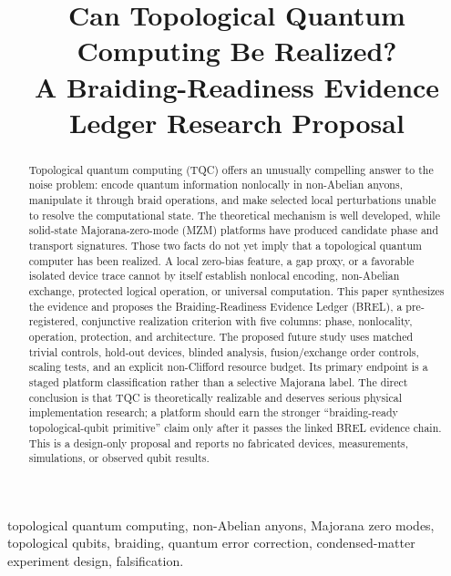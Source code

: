 \documentclass[conference]{IEEEtran}
\begin{document}
\title{Can Topological Quantum Computing Be Realized?\\
\large A Braiding-Readiness Evidence Ledger Research Proposal}

\author{
}

\maketitle

\begin{abstract}
Topological quantum computing (TQC) offers an unusually compelling answer to the noise problem: encode quantum information nonlocally in non-Abelian anyons, manipulate it through braid operations, and make selected local perturbations unable to resolve the computational state. The theoretical mechanism is well developed, while solid-state Majorana-zero-mode (MZM) platforms have produced candidate phase and transport signatures. Those two facts do not yet imply that a topological quantum computer has been realized. A local zero-bias feature, a gap proxy, or a favorable isolated device trace cannot by itself establish nonlocal encoding, non-Abelian exchange, protected logical operation, or universal computation. This paper synthesizes the evidence and proposes the Braiding-Readiness Evidence Ledger (BREL), a pre-registered, conjunctive realization criterion with five columns: phase, nonlocality, operation, protection, and architecture. The proposed future study uses matched trivial controls, hold-out devices, blinded analysis, fusion/exchange order controls, scaling tests, and an explicit non-Clifford resource budget. Its primary endpoint is a staged platform classification rather than a selective Majorana label. The direct conclusion is that TQC is theoretically realizable and deserves serious physical implementation research; a platform should earn the stronger ``braiding-ready topological-qubit primitive'' claim only after it passes the linked BREL evidence chain. This is a design-only proposal and reports no fabricated devices, measurements, simulations, or observed qubit results.
\end{abstract}

\begin{IEEEkeywords}
topological quantum computing, non-Abelian anyons, Majorana zero modes, topological qubits, braiding, quantum error correction, condensed-matter experiment design, falsification.
\end{IEEEkeywords}
\end{document}
